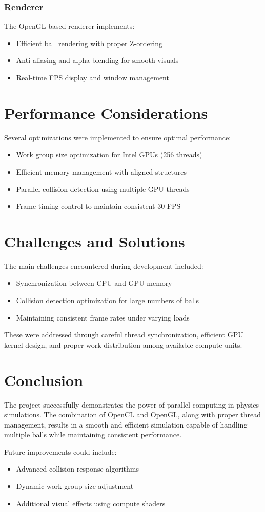 \documentclass[12pt]{article}
\begin{document}
\subsubsection{Renderer}
The OpenGL-based renderer implements:
\begin{itemize}
    \item Efficient ball rendering with proper Z-ordering
    \item Anti-aliasing and alpha blending for smooth visuals
    \item Real-time FPS display and window management
\end{itemize}

\section{Performance Considerations}
Several optimizations were implemented to ensure optimal performance:

\begin{itemize}
    \item Work group size optimization for Intel GPUs (256 threads)
    \item Efficient memory management with aligned structures
    \item Parallel collision detection using multiple GPU threads
    \item Frame timing control to maintain consistent 30 FPS
\end{itemize}

\section{Challenges and Solutions}
The main challenges encountered during development included:

\begin{itemize}
    \item Synchronization between CPU and GPU memory
    \item Collision detection optimization for large numbers of balls
    \item Maintaining consistent frame rates under varying loads
\end{itemize}

These were addressed through careful thread synchronization, efficient GPU kernel design, and proper work distribution among available compute units.

\section{Conclusion}
The project successfully demonstrates the power of parallel computing in physics simulations. The combination of OpenCL and OpenGL, along with proper thread management, results in a smooth and efficient simulation capable of handling multiple balls while maintaining consistent performance.

Future improvements could include:
\begin{itemize}
    \item Advanced collision response algorithms
    \item Dynamic work group size adjustment
    \item Additional visual effects using compute shaders
\end{itemize}
\end{document}
